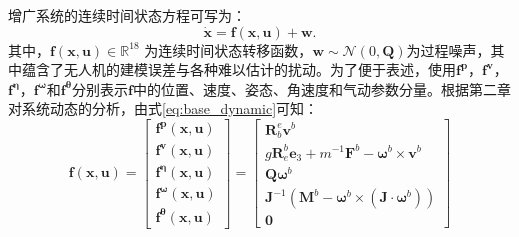 增广系统的连续时间状态方程可写为：
\begin{equation}
    \dot{\bm{x}} = \bm{f}(\bm{x}, \bm{u})+\bm{w}.
\end{equation}
其中，$\bm{f}(\bm{x}, \bm{u}) \in \mathbb{R}^{18}$ 为连续时间状态转移函数，$\bm{w} \sim \mathcal{N}(0, \bm{Q})$为过程噪声，其中蕴含了无人机的建模误差与各种难以估计的扰动。为了便于表述，使用$\bm{f^p}$，$\bm{f^v}$，$\bm{f^{\eta}}$，$\bm{f^{\omega}}$和$\bm{f^{\theta}}$分别表示$\bm{f}$中的位置、速度、姿态、角速度和气动参数分量。根据第二章对系统动态的分析，由式\eqref{eq:base_dynamic}可知：
\begin{equation}
    \bm{f}(\bm{x}, \bm{u}) = 
    \begin{bmatrix}
        \bm{f^p}(\bm{x}, \bm{u}) \\
        \bm{f^v}(\bm{x}, \bm{u}) \\
        \bm{f^{\eta}}(\bm{x}, \bm{u}) \\
        \bm{f^{\omega}}(\bm{x}, \bm{u}) \\
        \bm{f^{\theta}}(\bm{x}, \bm{u})
    \end{bmatrix} =
    \begin{bmatrix}
        \bm{R}_b^e \bm{v}^b \\
        g\bm{R}_e^b \bm{e}_{3} +  m^{-1}\bm{F}^b - \bm{\omega}^b \times \bm{v}^b \\ 
        \bm{Q}\bm{\omega}^b \\
        \bm{J}^{-1}(\bm{M}^b - \bm{\omega}^b\times(\bm{J}\cdot\bm{\omega}^b)) \\
        \bm{0}
    \end{bmatrix}
\end{equation}

